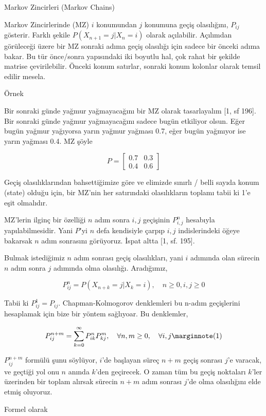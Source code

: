 \documentclass[12pt,fleqn]{article}\usepackage{../../common}
\begin{document}
Markov Zincirleri (Markov Chains)

Markov Zincirlerinde (MZ) $i$ konumundan $j$ konumuna geçiş olasılığını,
$P_{ij}$ gösterir. Farklı şekile $P(X_{n+1} = j | X_{n} = i)$ olarak
açılabilir. Açılımdan görüleceği üzere bir MZ sonraki adıma geçiş olasılığı için
sadece bir önceki adıma bakar. Bu tür önce/sonra yapısındaki iki boyutlu hal,
çok rahat bir şekilde matrise çevirilebilir. Önceki konum satırlar, sonraki
konum kolonlar olarak temsil edilir mesela.

Örnek

Bir sonraki günde yağmur yağmayacağını bir MZ olarak tasarlayalım [1, sf 196].
Bir sonraki günde yağmur yağmayacağını sadece bugün etkiliyor olsun. Eğer bugün
yağmur yağıyorsa yarın yağmur yağması 0.7, eğer bugün yağmıyor ise yarın
yağması 0.4. MZ şöyle

$$ 
P =
\left[\begin{array}{cc}
0.7 & 0.3 \\
0.4 & 0.6
\end{array}\right]
$$

Geçiş olasılıklarından bahsettiğimize göre ve elimizde sınırlı / belli sayıda
konum (state) olduğu için, bir MZ'nin her satırındaki olasılıkların toplamı
tabii ki 1'e eşit olmalıdır.

MZ'lerin ilginç bir özelliği $n$ adım sonra $i,j$ geçişinin $P_{i,j}^n$
hesabıyla yapılabilmesidir. Yani $P$'yi $n$ defa kendisiyle çarpıp $i,j$
indislerindeki öğeye bakarsak $n$ adım sonrasını görüyoruz. İspat altta [1, sf. 195].

Bulmak istediğimiz $n$ adım sonrası geçiş olasılıkları, yani $i$ adımında olan
sürecin $n$ adım sonra $j$ adımında olma olasılığı. Aradığımız,

$$
P_{ij}^n = P ( X_{n+k} = j | X_k = i ), \quad n \ge 0, i,j \ge 0
$$

Tabii ki $P_{ij}^1 = P_{ij}$. Chapman-Kolmogorov denklemleri bu n-adım
geçişlerini hesaplamak için bize bir yöntem sağlıyoar. Bu denklemler,

$$
P_{ij}^{n+m} = \sum_{k=0}^{\infty} P_{ik}^n P_{kj}^m,
\quad \forall n,m \ge 0, \quad \forall i,j
\mlabel{1}
$$

$P_{ij}^{n+m}$ formülü şunu söylüyor, $i$'de başlayan süreç $n+m$ geçiş sonrası
$j$'e varacak, ve geçtiği yol onu $n$ anında $k$'den geçirecek. O zaman tüm bu
geçiş noktaları $k$'ler üzerinden bir toplam alırsak sürecin $n+m$ adım sonrası
$j$'de olma olasılığını elde etmiş oluyoruz.

Formel olarak 
\end{document}
